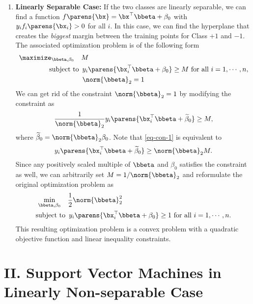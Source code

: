\documentclass[12pt]{article}
\begin{document}
\begin{enumerate}[label=\textbf{\arabic*.}]
	\item \textbf{Linearly Separable Case:} If the two classes are linearly separable, we can find a function $f \parens{\bx} = \bx^\top \bbeta + \beta_0 $ with $y_i f_i \parens{\bx_i} > 0 $ for all $i$. In this case, we can find the hyperplane that creates the \emph{biggest} margin between the training points for Class $+1$ and $-1$. The associated optimization problem is of the following form 
	\begin{equation}\label{orig}
		\begin{aligned}
			\maximize_{\bbeta, \beta_0} \hspace{10pt} & M  \\
			\text{subject to } & \, y_i \parens{\bx_i^\top \bbeta + \beta_0} \ge M \text{ for all } i = 1, \cdots, n, \\ 
			& \, \norm{\bbeta}_2 = 1
		\end{aligned}
	\end{equation}
	We can get rid of the constraint $\norm{\bbeta}_2 = 1$ by modifying the constraint as 
	\begin{equation}\label{eq-con-1}
		\frac{1}{\norm{\bbeta}_2} y_i \parens{\bx_i^\top \bbeta + \widetilde{\beta}_0} \ge M, 
	\end{equation}
	where $\widetilde{\beta}_0 = \norm{\bbeta}_2 \beta_0$. Note that \eqref{eq-con-1} is equivalent to 
	\begin{equation}
		y_i \parens{\bx_i^\top \bbeta + \widetilde{\beta}_0} \ge \norm{\bbeta}_2 M.  
	\end{equation}
	Since any positively scaled multiple of $\bbeta$ and $\beta_0$ satisfies the constraint as well, we can arbitrarily set $M = 1/\norm{\bbeta}_2$ and  reformulate the original optimization problem as 
	\begin{equation}
		\begin{aligned}
			\min_{\bbeta, \beta_0} \hspace{10pt} & \frac{1}{2} \norm{\bbeta}_2^2 \\
		\text{subject to } & \, y_i \parens{\bx_i^\top \bbeta + \beta_0} \ge 1 \text{ for all } i = 1, \cdots, n. 
		\end{aligned}
	\end{equation}
	This resulting optimization problem is a convex problem with a quadratic objective function and linear inequality constraints. 
	
\end{enumerate}


\section*{II. Support Vector Machines in Linearly Non-separable Case}
\end{document}
